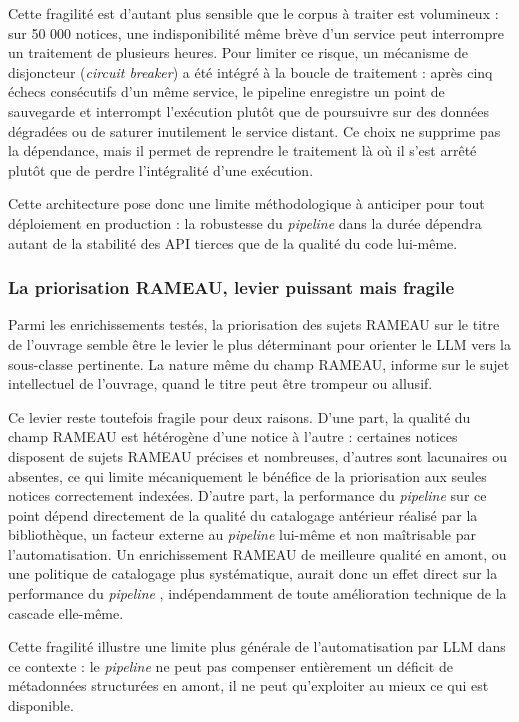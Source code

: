 Cette fragilité est d'autant plus sensible que le corpus à traiter est volumineux : sur 50 000 notices, une indisponibilité même brève d'un service peut interrompre un traitement de plusieurs heures. Pour limiter ce risque, un mécanisme de disjoncteur (\emph{circuit breaker}) a été intégré à la boucle de traitement : après cinq échecs consécutifs d'un même service, le pipeline enregistre un point de sauvegarde et interrompt l'exécution plutôt que de poursuivre sur des données dégradées ou de saturer inutilement le service distant. Ce choix ne supprime pas la dépendance, mais il permet de reprendre le traitement là où il s'est arrêté plutôt que de perdre l'intégralité d'une exécution.

Cette architecture pose donc une limite méthodologique à anticiper pour tout déploiement en production : la robustesse du \textit{pipeline}  dans la durée dépendra autant de la stabilité des API tierces que de la qualité du code lui-même.

\subsubsection*{La priorisation RAMEAU, levier puissant mais fragile}

Parmi les enrichissements testés, la priorisation des sujets RAMEAU sur le titre de l'ouvrage semble être le levier le plus déterminant pour orienter le LLM vers la sous-classe pertinente. La nature même du champ RAMEAU,  informe sur le sujet intellectuel  de l'ouvrage, quand le titre peut être trompeur ou allusif.

Ce levier reste toutefois fragile pour deux raisons. D'une part, la qualité du champ RAMEAU est hétérogène d'une notice à l'autre : certaines notices disposent de sujets RAMEAU précises et nombreuses, d'autres sont lacunaires ou absentes, ce qui limite mécaniquement le bénéfice de la priorisation aux seules notices correctement indexées. D'autre part, la performance du \textit{pipeline}  sur ce point dépend directement de la qualité du catalogage antérieur réalisé par la bibliothèque, un facteur externe au \textit{pipeline}  lui-même et non maîtrisable par l'automatisation. Un enrichissement RAMEAU de meilleure qualité en amont, ou une politique de catalogage plus systématique, aurait donc un effet direct sur la performance du \textit{pipeline} , indépendamment de toute amélioration technique de la cascade elle-même.

Cette fragilité illustre une limite plus générale de l'automatisation par LLM dans ce contexte : le \textit{pipeline}  ne peut pas compenser entièrement un déficit de métadonnées structurées en amont, il ne peut qu'exploiter au mieux ce qui est disponible.

